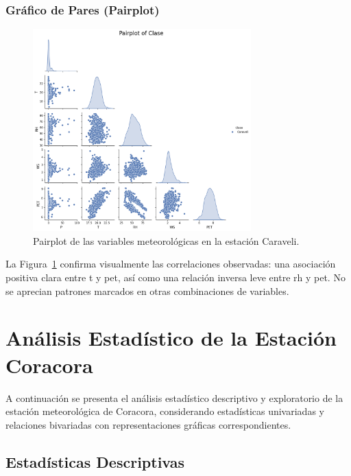 \subsubsection*{Gráfico de Pares (Pairplot)}
\begin{figure}[htbp]
\centering
\includegraphics[width=0.75\textwidth]{resultados/por_estacion_meteorologica/Caraveli/pairplot.png}
\caption{Pairplot de las variables meteorológicas en la estación Caraveli.}
\label{fig:caraveli_pairplot}
\end{figure}
La Figura~\ref{fig:caraveli_pairplot} confirma visualmente las correlaciones observadas: una asociación positiva clara entre \gls{t} y \gls{pet}, así como una relación inversa leve entre \gls{rh} y \gls{pet}. No se aprecian patrones marcados en otras combinaciones de variables.



\section{Análisis Estadístico de la Estación Coracora}

A continuación se presenta el análisis estadístico descriptivo y exploratorio de la estación meteorológica de Coracora, considerando estadísticas univariadas y relaciones bivariadas con representaciones gráficas correspondientes.

\subsection{Estadísticas Descriptivas}

